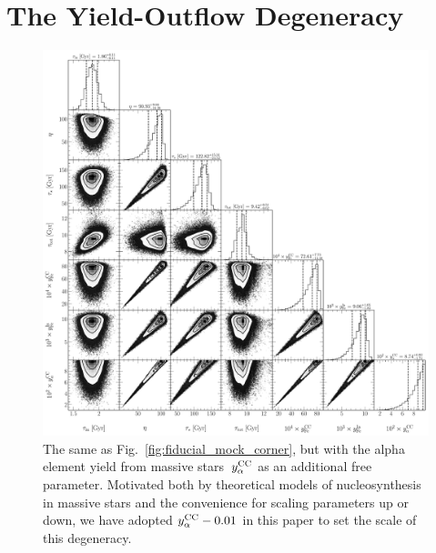 \documentclass[ms.tex]{subfiles}
\begin{document}
\renewcommand\theequation{\thesection\arabic{equation}}
\renewcommand\thefigure{\thesection\arabic{figure}}
\setcounter{equation}{0}
\setcounter{figure}{0}

\section{The Yield-Outflow Degeneracy}
\label{sec:degeneracy}

\begin{figure}
\centering
\includegraphics[scale = 0.4]{degeneracy_512k.pdf}
\caption{
The same as Fig.~\ref{fig:fiducial_mock_corner}, but with the alpha element
yield from massive stars~$y_\alpha^\text{CC}$ as an additional free parameter.
Motivated both by theoretical models of nucleosynthesis in massive stars and
the convenience for scaling parameters up or down, we have adopted
$y_\alpha^\text{CC} - 0.01$ in this paper to set the scale of this degeneracy.
}
\label{fig:degeneracy}
\end{figure}
\end{document}
